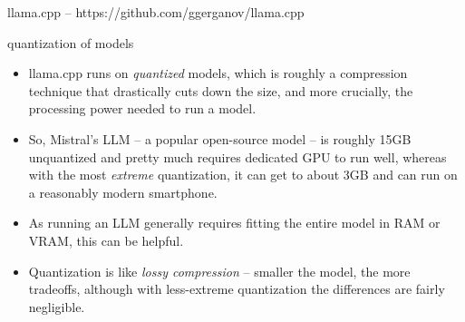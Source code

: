 \documentclass[handout]{beamer} %
\begin{document}
\begin{frame}[plain]
\end{frame}



\begin{frame}
	llama.cpp -- https://github.com/ggerganov/llama.cpp
\end{frame}

\begin{frame}{quantization of models}
	\begin{itemize}
		\item llama.cpp runs on \textit{quantized} models, which is roughly a compression technique that drastically cuts down the size, and more crucially, the processing power needed to run a model.
		\pause
		\item So, Mistral's LLM -- a popular open-source model -- is roughly 15GB unquantized and pretty much requires dedicated GPU to run well, whereas with the most \textit{extreme} quantization, it can get to about 3GB and can run on a reasonably modern smartphone.
		\pause
		\item As running an LLM generally requires fitting the entire model in RAM or VRAM, this can be helpful.
		\pause 
		\item Quantization is like \textit{lossy compression} -- smaller the model, the more tradeoffs, although with less-extreme quantization the differences are fairly negligible.
	\end{itemize}
	
\end{frame}
\end{document}
